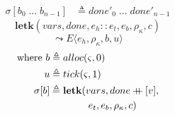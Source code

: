 \documentclass[12pt,draft]{article}
\newcommand\mdoubleplus{\ensuremath{\mathbin{+\mkern-9mu+}}}
\begin{document}
\begin{multicols*}{2}
\begin{align*}
\sigma[b_0\;...\;b_{n-1}] &\triangleq done'_0\;...\;done'_{n-1}
\end{align*}
\[
\textbf{letk}(vars, done, e_h::e_t, e_b , \rho_{\kappa}, c)
\]
\vspace{-7mm}
\[
\leadsto
E\langle
e_h , \rho_{\kappa} , b , u
\rangle
\]
\vspace{-10mm}
\begin{align*}
\text{where } b &\triangleq alloc(\varsigma, 0) \\
u &\triangleq tick(\varsigma, 1) \\
\sigma[b] &\triangleq \textbf{letk}(vars, done \mdoubleplus [v], \\
&\;\;\;\;\;\;\;\;\;\;\;\;\;\; e_t , e_b , \rho_{\kappa} , c)
\end{align*}

\vfill\null
\columnbreak



\end{multicols*}
\end{document}
